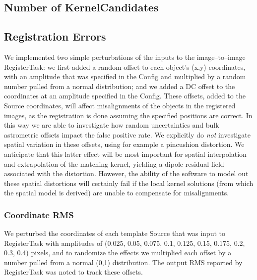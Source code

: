 \documentclass[prd, nofootinbib, floatfix, 11pt,tightenlines,times]{article}
\begin{document}
\subsection{Number of KernelCandidates}

\subsection{Registration Errors}

We implemented two simple perturbations of the inputs to the
image--to--image RegisterTask: we first added a random offset to each
object's (x,y)-coordinates, with an amplitude that was specified in
the Config and multiplied by a random number pulled from a normal
distribution; and we added a DC offset to the coordinates at an
amplitude specified in the Config.  These offsets, added to the Source
coordinates, will affect misalignments of the objects in the
registered images, as the registration is done assuming the specified
positions are correct.  In this way we are able to investigate how
random uncertainties and bulk astrometric offsets impact the false
positive rate.  We explicitly do {\it not} investigate spatial
variation in these offsets, using for example a pincushion distortion.
We anticipate that this latter effect will be most important for
spatial interpolation and extrapolation of the matching kernel,
yielding a dipole residual field associated with the distortion.
However, the ability of the software to model out these spatial
distortions will certainly fail if the local kernel solutions (from
which the spatial model is derived) are unable to compensate for
misalignments.


\subsubsection{Coordinate RMS}

We perturbed the coordinates of each template Source that was input to
RegisterTask with amplitudes of (0.025, 0.05, 0.075, 0.1, 0.125, 0.15,
0.175, 0.2, 0.3, 0.4) pixels, and to randomize the effects we
multiplied each offset by a number pulled from a normal (0,1)
distribution.  The output RMS reported by RegisterTask was noted to
track these offsets.
\end{document}
